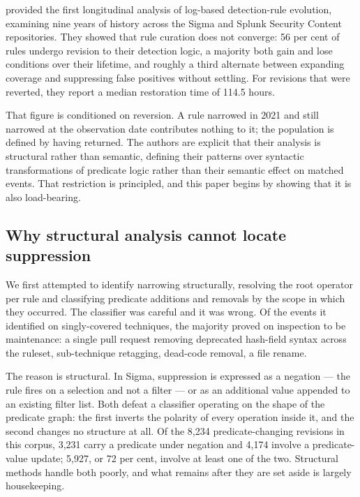 \citet{long2026} provided the first longitudinal analysis of log-based detection-rule evolution, examining nine years of history across the Sigma and Splunk Security Content repositories. They showed that rule curation does not converge: 56 per cent of rules undergo revision to their detection logic, a majority both gain and lose conditions over their lifetime, and roughly a third alternate between expanding coverage and suppressing false positives without settling. For revisions that were reverted, they report a median restoration time of 114.5 hours.

That figure is conditioned on reversion. A rule narrowed in 2021 and still narrowed at the observation date contributes nothing to it; the population is defined by having returned. The authors are explicit that their analysis is structural rather than semantic, defining their patterns over syntactic transformations of predicate logic rather than their semantic effect on matched events. That restriction is principled, and this paper begins by showing that it is also load-bearing.

\subsection{Why structural analysis cannot locate suppression}

We first attempted to identify narrowing structurally, resolving the root operator per rule and classifying predicate additions and removals by the scope in which they occurred. The classifier was careful and it was wrong. Of the events it identified on singly-covered techniques, the majority proved on inspection to be maintenance: a single pull request removing deprecated hash-field syntax across the ruleset, sub-technique retagging, dead-code removal, a file rename.

The reason is structural. In Sigma, suppression is expressed as a negation --- the rule fires on a selection and not a filter --- or as an additional value appended to an existing filter list. Both defeat a classifier operating on the shape of the predicate graph: the first inverts the polarity of every operation inside it, and the second changes no structure at all. Of the 8,234 predicate-changing revisions in this corpus, 3,231 carry a predicate under negation and 4,174 involve a predicate-value update; 5,927, or 72 per cent, involve at least one of the two. Structural methods handle both poorly, and what remains after they are set aside is largely housekeeping.

